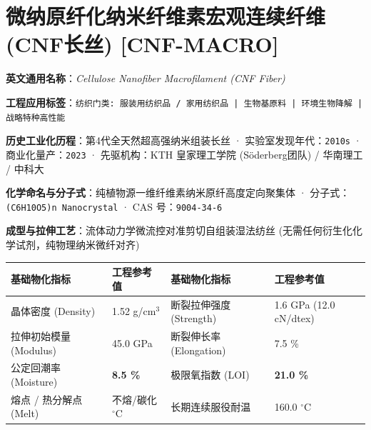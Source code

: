 \documentclass[11pt,openright,twoside,UTF8]{ctexbook}
\begin{document}
\section{微纳原纤化纳米纤维素宏观连续纤维 (CNF长丝) [CNF-MACRO]}
\label{sec:cnf-macro}

\noindent\textbf{英文通用名称}：\textit{Cellulose Nanofiber Macrofilament (CNF Fiber)}\par
\noindent\textbf{工程应用标签}：\texttt{纺织门类: 服装用纺织品 / 家用纺织品 | 生物基原料 | 环境生物降解 | 战略特种高性能}\par
\noindent\textbf{历史工业化历程}：第4代全天然超高强纳米组装长丝 · 实验室发现年代：\texttt{2010s} · 商业化量产：\texttt{2023} · 先驱机构：KTH 皇家理工学院 (Söderberg团队) / 华南理工 / 中科大\par
\noindent\textbf{化学命名与分子式}：纯植物源一维纤维素纳米原纤高度定向聚集体 · 分子式：\texttt{(C6H10O5)n Nanocrystal} · CAS 号：\texttt{9004-34-6}\par
\noindent\textbf{成型与拉伸工艺}：流体动力学微流控对准剪切自组装湿法纺丝 (无需任何衍生化化学试剂，纯物理纳米微纤对齐)\par

\vspace{0.15cm}
\begin{center}
\small
\begin{tabularx}{\textwidth}{p{3.8cm}Xp{3.8cm}X}
\toprule
\textbf{基础物化指标} & \textbf{工程参考值} & \textbf{基础物化指标} & \textbf{工程参考值} \\
\midrule
晶体密度 (Density) & 1.52 g/cm$^3$ & 断裂拉伸强度 (Strength) & 1.6 GPa (12.0 cN/dtex) \\
拉伸初始模量 (Modulus) & 45.0 GPa & 断裂伸长率 (Elongation) & 7.5 \% \\
公定回潮率 (Moisture) & \textbf{8.5 \%} & 极限氧指数 (LOI) & \textbf{21.0 \%} \\
熔点 / 热分解点 (Melt) & 不熔/碳化 $^\circ\mathrm{C}$ & 长期连续服役耐温 & 160.0 $^\circ\mathrm{C}$ \\
\bottomrule
\end{tabularx}
\end{center}
\vspace{0.15cm}
\end{document}

